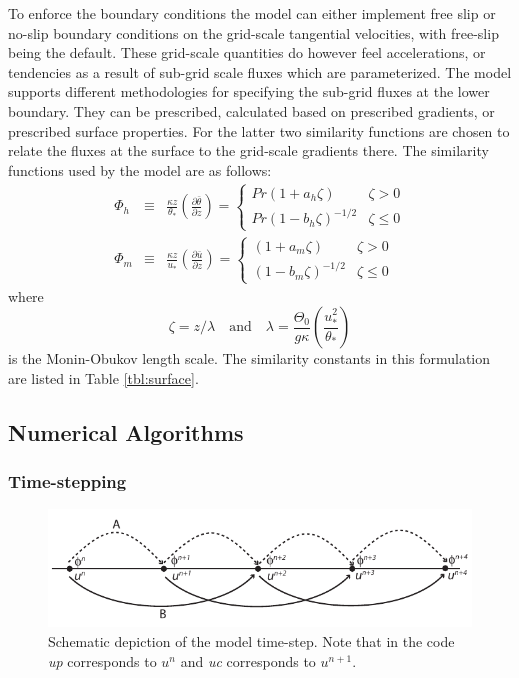 \documentclass[11pt,a4paper]{article}
\begin{document}
To enforce the boundary conditions the model can either implement free
slip or no-slip boundary conditions on the grid-scale tangential
velocities, with free-slip being the default.  These grid-scale
quantities do however feel accelerations, or tendencies as a result of
sub-grid scale fluxes which are parameterized.  The model supports
different methodologies for specifying the sub-grid fluxes at the
lower boundary.  They can be prescribed, calculated based on
prescribed gradients, or prescribed surface properties.  For the
latter two similarity functions are chosen to relate the fluxes at the
surface to the grid-scale gradients there.  The similarity functions
used by the model are as follows:
\begin{eqnarray}
\Phi_h & \equiv &\frac{\kappa z}{\theta_*} \left(\frac{\partial
\bar{\theta}}{\partial z}\right) = \begin{cases} Pr(1+a_h\zeta) &
\zeta > 0 \\ Pr(1-b_h\zeta)^{-1/2} & \zeta \le 0 \end{cases} \\ \Phi_m
& \equiv & \frac{\kappa z}{u_*} \left( \frac{\partial
\bar{u}}{\partial z} \right) = \begin{cases} (1+a_m\zeta) & \zeta > 0
\\ (1-b_m\zeta)^{-1/2} & \zeta \le 0 \end{cases}
\end{eqnarray}
where
\[ \zeta = z/\lambda \quad \text{and} \quad \lambda =
\frac{\Theta_0}{g\kappa} \left(\frac{u_*^2}{\theta_*}\right) \] is the
Monin-Obukov length scale.  The similarity constants in this
formulation are listed in Table \ref{tbl:surface}.


\subsection{Numerical Algorithms}

\subsubsection{Time-stepping}

\begin{figure}[htb]
\centering \leavevmode 
\includegraphics[width=12cm]{timestep}
\caption{Schematic depiction of the model time-step.  Note that in the
  code \emph{up} corresponds to $u^n$ and \emph{uc} corresponds to
  $u^{n+1}.$}
\label{fig:timestep}
\end{figure}
\end{document}
